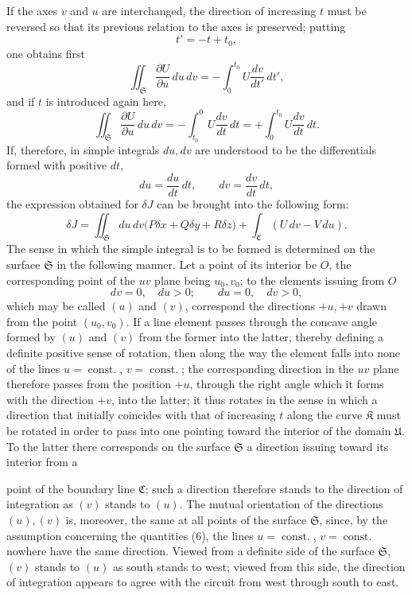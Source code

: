 \documentclass[11pt,a4paper,leqno]{article}
\begin{document}
If the axes $v$ and $u$ are interchanged, the direction of increasing
$t$ must be reversed so that its previous relation to the axes is
preserved; putting
\[
t'=-t+t_0,
\]
one obtains first
\[
\iint_{\mathfrak{S}}\frac{\partial U}{\partial u}\,du\,dv
=-\int_0^{t_0}U\frac{dv}{dt'}\,dt',
\]
and if $t$ is introduced again here,
\[
\iint_{\mathfrak{S}}\frac{\partial U}{\partial u}\,du\,dv
=-\int_{t_0}^{0}U\frac{dv}{dt}\,dt
=+\int_0^{t_0}U\frac{dv}{dt}\,dt.
\]
If, therefore, in simple integrals $du,dv$ are understood to be the
differentials formed with positive $dt$,
\[
du=\frac{du}{dt}\,dt,\qquad
dv=\frac{dv}{dt}\,dt,
\]
the expression obtained for $\delta J$ can be brought into the following form:
\[
\delta J=\iint_{\mathfrak{S}}du\,dv
\bigl(P\delta x+Q\delta y+R\delta z\bigr)
+\int_{\mathfrak{C}}(U\,dv-V\,du).
\]
The sense in which the simple integral is to be formed is determined
on the surface $\mathfrak{S}$ in the following manner. Let a point of its interior
be $O$, the corresponding point of the $uv$ plane being $u_0,v_0$; to the
elements issuing from $O$
\[
dv=0,\quad du>0;\qquad du=0,\quad dv>0,
\]
which may be called $(u)$ and $(v)$, correspond the directions $+u,+v$
drawn from the point $(u_0,v_0)$. If a line element passes through the
concave angle formed by $(u)$ and $(v)$ from the former into the latter,
thereby defining a definite positive sense of rotation, then along the
way the element falls into none of the lines $u=\operatorname{const.}$, $v=\operatorname{const.}$;
the corresponding direction in the $uv$ plane therefore passes from the
position $+u$, through the right angle which it forms with the direction
$+v$, into the latter; it thus rotates in the sense in which a direction
that initially coincides with that of increasing $t$ along the curve
$\mathfrak{K}$ must be rotated in order to pass into one pointing toward the
interior of the domain $\mathfrak{U}$. To the latter there corresponds on the
surface $\mathfrak{S}$ a direction issuing toward its interior from a

point of the boundary line $\mathfrak{C}$; such a direction therefore stands to
the direction of integration as $(v)$ stands to $(u)$. The mutual orientation
of the directions $(u),(v)$ is, moreover, the same at all points of the
surface $\mathfrak{S}$, since, by the assumption concerning the quantities (6),
the lines $u=\operatorname{const.}$, $v=\operatorname{const.}$ nowhere have the same direction.
Viewed from a definite side of the surface $\mathfrak{S}$, $(v)$ stands to $(u)$
as south stands to west; viewed from this side, the direction of integration
appears to agree with the circuit from west through south to east.
\end{document}
